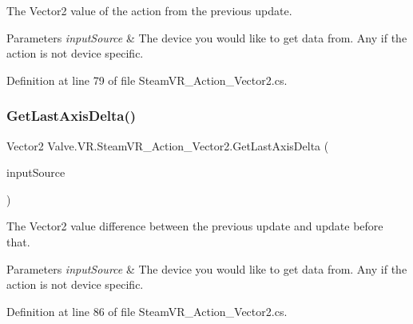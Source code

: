 The Vector2 value of the action from the previous update. 


\begin{DoxyParams}{Parameters}
{\em input\+Source} & The device you would like to get data from. Any if the action is not device specific.\\
\hline
\end{DoxyParams}


Definition at line 79 of file Steam\+V\+R\+\_\+\+Action\+\_\+\+Vector2.\+cs.

\mbox{\label{class_valve_1_1_v_r_1_1_steam_v_r___action___vector2_a3bebc5e4564895072ce9ed9f532b7a97}} 
\subsubsection{\texorpdfstring{GetLastAxisDelta()}{GetLastAxisDelta()}}
{\footnotesize\ttfamily Vector2 Valve.\+V\+R.\+Steam\+V\+R\+\_\+\+Action\+\_\+\+Vector2.\+Get\+Last\+Axis\+Delta (\begin{DoxyParamCaption}\item[{\mbox{\hyperlink{namespace_valve_1_1_v_r_a82e5bf501cc3aa155444ee3f0662853f}{Steam\+V\+R\+\_\+\+Input\+\_\+\+Sources}}}]{input\+Source }\end{DoxyParamCaption})}



The Vector2 value difference between the previous update and update before that. 


\begin{DoxyParams}{Parameters}
{\em input\+Source} & The device you would like to get data from. Any if the action is not device specific.\\
\hline
\end{DoxyParams}


Definition at line 86 of file Steam\+V\+R\+\_\+\+Action\+\_\+\+Vector2.\+cs.

\mbox{\label{class_valve_1_1_v_r_1_1_steam_v_r___action___vector2_a7ceb21535842b499cd8e73ffbee4be90}} 
